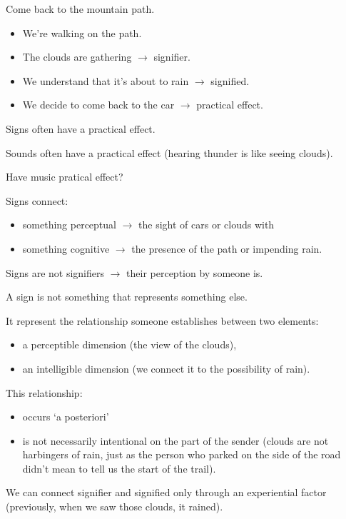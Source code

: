 Come back to the mountain path.

\begin{itemize}
\tightlist
\item We're walking on the path.
\item The clouds are gathering \(\rightarrow\) signifier.
\item We understand that it's about to rain \(\rightarrow\) signified.
\item We decide to come back to the car \(\rightarrow\) practical effect.
\end{itemize}

Signs often have a practical effect.

Sounds often have a practical effect (hearing thunder is like seeing clouds).

Have music pratical effect?

Signs connect: 
\begin{itemize}
\item something perceptual \(\rightarrow\) the sight of cars or clouds with 
\item something cognitive \(\rightarrow\) the presence of the path or impending rain.
\end{itemize}

Signs are not signifiers \(\rightarrow\) their perception by someone is.

A sign is not something that represents something else.

It represent the relationship someone establishes between two elements:

\begin{itemize}
\item a perceptible dimension (the view of the clouds), 
\item  an intelligible dimension (we connect it to the possibility of rain).
\end{itemize}

This relationship: 

\begin{itemize}
\item occurs `a posteriori'
\item is not necessarily intentional on the part of the sender (clouds are not harbingers of rain, just as the person who parked on the side of the road didn't mean to tell us the start of the trail).
\end{itemize}
We can connect signifier and signified only through an experiential factor (previously, when we saw those clouds, it rained).

